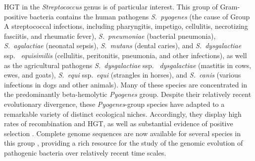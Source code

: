 \documentclass[12pt]{article}
\begin{document}
HGT in the {\em Streptococcus} genus is of particular interest.  This group
of Gram-positive bacteria contains the human pathogens {\em S.\ pyogenes}
(the cause of Group A streptococcal infections, including pharyngitis,
impetigo, cellulitis, necrotizing fasciitis, and rheumatic fever), {\em S.\
  pneumoniae} (bacterial pneumonia), {\em S.\ agalactiae} (neonatal sepsis),
{\em S.\ mutans} (dental caries), and {\em S.\ dysgalactiae} ssp.\ {\em
  equisimilis} (cellulitis, peritonitis, pneumonia, and other infections),
as well as the agricultural pathogens {\em S.\ dysgalactiae} ssp.\ {\em
  dysgalactiae} (mastitis in cows, ewes, and goats), {\em S.\ equi} ssp.\
{\em equi} (strangles in horses), and {\em S.\ canis} (various infections
in dogs and other animals).  Many of these species are concentrated in the
predominantly beta-hemolytic {\em Pyogenes} group.  Despite their
relatively recent evolutionary divergence, these {\em Pyogenes}-group
species have adapted to a remarkable variety of distinct ecological niches.
Accordingly, they display high rates of recombination and HGT, as well as
substantial evidence of positive selection
\citep{Feil2001,Marri2006,Anisimova2007,Lefebure2007,Suzuki2011}.  Complete
genome sequences are now available for several species in this group
\citep[e.g.,][]{Ferretti2001,Holden2009,Shimomura2011,Suzuki2011},
providing a rich resource for the study of the genomic evolution of
pathogenic bacteria over relatively recent time scales.
\end{document}
